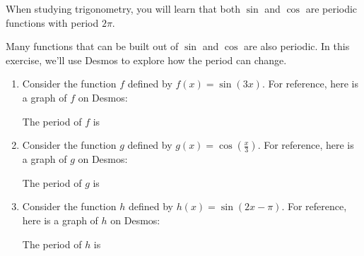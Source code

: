 \documentclass{ximera}
\author{Kenneth Berglund}
\begin{document}
\begin{exercise}
When studying trigonometry, you will learn that both $\sin$ and $\cos$ are periodic functions with period $2\pi$.

Many functions that can be built out of $\sin$ and $\cos$ are also periodic. In this exercise, we'll use Desmos to explore how the period can change. 

\begin{enumerate}

\item Consider the function $f$ defined by $f(x) = \sin(3x)$. For reference, here is a graph of $f$ on Desmos:
\begin{center}
\end{center}

The period of $f$ is
\begin{multipleChoice}
\end{multipleChoice}

\item Consider the function $g$ defined by $g(x) = \cos\left(\frac{x}{3}\right)$. For reference, here is a graph of $g$ on Desmos:
\begin{center}
\end{center}

The period of $g$ is
\begin{multipleChoice}
\end{multipleChoice}

\item Consider the function $h$ defined by $h(x) = \sin(2x - \pi)$. For reference, here is a graph of $h$ on Desmos:
\begin{center}
\end{center}

The period of $h$ is
\begin{multipleChoice}
\end{multipleChoice}

\end{enumerate}

\end{exercise}
\end{document}
